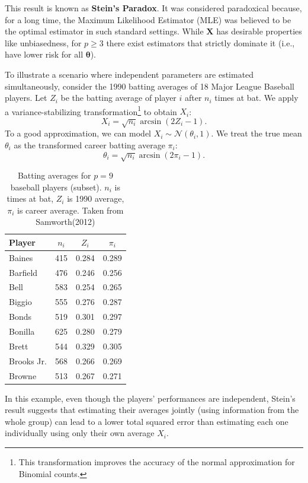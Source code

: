 This result is known as \textbf{Stein's Paradox}. It was considered paradoxical because, for a long time, the Maximum Likelihood Estimator (MLE) was believed to be the optimal estimator in such standard settings. While \(\mathbf{X}\) has desirable properties like unbiasedness, for \(p \ge 3\) there exist estimators that strictly dominate it (i.e., have lower risk for all \(\boldsymbol{\theta}\)).


\begin{ex}
\label{ex:baseball}

To illustrate a scenario where independent parameters are estimated simultaneously, consider the 1990 batting averages of 18 Major League Baseball players.
Let \(Z_i\) be the batting average of player \(i\) after \(n_i\) times at bat. We apply a variance-stabilizing transformation\footnote{This transformation improves the accuracy of the normal approximation for Binomial counts.} to obtain \(X_i\):
\[
X_i = \sqrt{n_i} \arcsin(2Z_i - 1).
\]
To a good approximation, we can model \(X_i \sim \mathcal{N}(\theta_i, 1)\).
We treat the true mean \(\theta_i\) as the transformed career batting average \(\pi_i\):
\[
\theta_i = \sqrt{n_i} \arcsin(2\pi_i - 1).
\]

\begin{table}[h]
\centering
\label{tab:baseball_data}
\begin{tabular}{lccc}
\hline
\textbf{Player} & {\(n_i\)} & {\(Z_i\)} & {\(\pi_{i}\)} \\
\hline
Baines      & 415 & 0.284 & 0.289 \\
Barfield    & 476 & 0.246 & 0.256 \\
Bell        & 583 & 0.254 & 0.265 \\
Biggio      & 555 & 0.276 & 0.287 \\
Bonds       & 519 & 0.301 & 0.297 \\
Bonilla     & 625 & 0.280 & 0.279 \\
Brett       & 544 & 0.329 & 0.305 \\
Brooks Jr.  & 568 & 0.266 & 0.269 \\
Browne      & 513 & 0.267 & 0.271 \\
\hline
\end{tabular}
\caption{Batting averages for \(p=9\) baseball players (subset). \(n_i\) is times at bat, \(Z_i\) is 1990 average, \(\pi_i\) is career average.
Taken from Samworth(2012)}
\end{table}

In this example, even though the players' performances are independent, Stein's result suggests that estimating their averages jointly (using information from the whole group) can lead to a lower total squared error than estimating each one individually using only their own average \(X_i\).
\end{ex}

